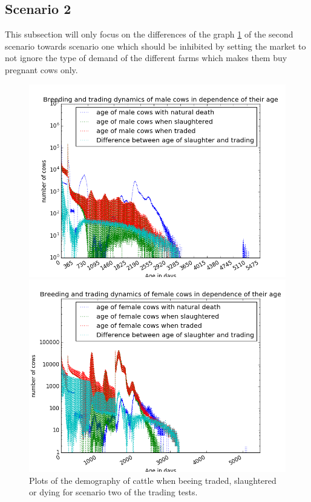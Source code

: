 \subsection{Scenario 2}
This subsection will only focus on the differences of the graph \ref{fig:demographyScen2} of the second scenario towards scenario one which should be inhibited by setting the market to not ignore the type of demand of the different farms which makes them buy pregnant cows only.
\begin{figure}[htbp]
\begin{minipage}{0.5\textwidth}
\centering
\noindent\includegraphics[width=0.9\linewidth,height=\textheight,
keepaspectratio]{scen2maleDemography.png} 
\end{minipage}
\begin{minipage}{0.5\textwidth}
\centering
\noindent\includegraphics[width=0.9\linewidth,height=\textheight,
keepaspectratio]{scen2femaleDemography.png} 
\end{minipage}
\caption[Demography in Scenario 2]{Plots of the demography of cattle when beeing traded, slaughtered or dying for scenario two of the trading tests.}\label{fig:demographyScen2}
\end{figure} 
